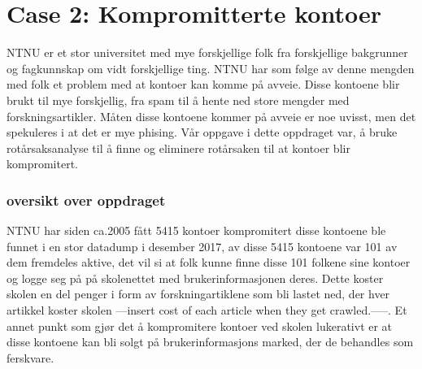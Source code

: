 \section{Case 2: Kompromitterte kontoer}
\label{sec:case_kontoer}
NTNU er et stor universitet med mye forskjellige folk fra forskjellige bakgrunner og fagkunnskap om vidt forskjellige ting. NTNU har som følge av denne mengden med folk et problem med at kontoer kan komme på avveie. Disse kontoene blir brukt til mye forskjellig, fra spam til å hente ned store mengder med forskningsartikler. Måten disse kontoene kommer på avveie er noe uvisst, men det spekuleres i at det er mye phising. Vår oppgave i dette oppdraget var, å bruke rotårsaksanalyse til å finne og eliminere rotårsaken til at kontoer blir kompromitert.

\subsubsection{oversikt over oppdraget}
NTNU har siden ca.2005 fått 5415 kontoer kompromitert disse kontoene ble funnet i en stor datadump i desember 2017, av disse 5415 kontoene var 101 av dem fremdeles aktive, det vil si at folk kunne finne disse 101 folkene sine kontoer og logge seg på på skolenettet med brukerinformasjonen deres. Dette koster skolen en del penger i form av forskningartiklene som bli lastet ned, der hver artikkel koster skolen ---insert cost of each article when they get crawled.-----. Et annet punkt som gjør det å kompromitere kontoer ved skolen lukerativt er at disse kontoene kan bli solgt på brukerinformasjons marked, der de behandles som ferskvare.